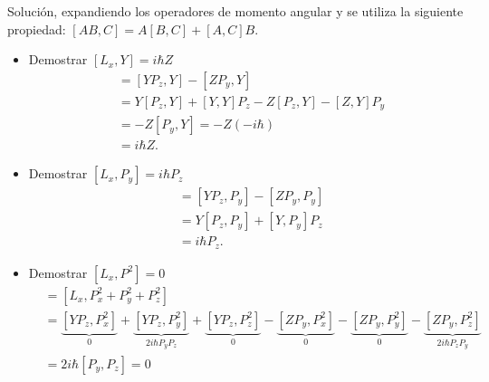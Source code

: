 \begin{ejercicio}
	Solución, expandiendo los operadores de momento angular y se utiliza la siguiente propiedad: $[AB,C] = A[B,C] + [A,C]B$.
	\begin{itemize}
		\item Demostrar $[L_x ,Y] = i\hbar Z$
			\begin{align*}
				&= [YP_z ,Y] - [ZP_y ,Y] \\
				&= Y[P_z ,Y] + [Y,Y]P_z - Z[P_z ,Y] - [Z,Y]P_y \\
				&= -Z[P_y ,Y] = -Z(-i\hbar) \\
				&= i\hbar Z.
			\end{align*}
		\item Demostrar $[L_x ,P_y] = i\hbar P_z$
			\begin{align*}
				&= [YP_z ,P_y] - [ZP_y ,P_y] \\
				&= Y[P_z ,P_y] + [Y,P_y]P_z \\
				&= i\hbar P_z.
			\end{align*}
		\item Demostrar $[L_x ,P^2] = 0$
			\begin{align*}
				&= [L_x ,P_x ^2 + P_y ^2 + P_z ^2] \\
				&= \underbrace{[YP_z,P_x ^2]}_{0} + \underbrace{[YP_z,P_y ^2]}_{2i\hbar P_y P_z} + \underbrace{[YP_z,P_z ^2]}_{0} - \underbrace{[ZP_y,P_x ^2]}_{0} - \underbrace{[ZP_y,P_y ^2]}_{0} - \underbrace{[ZP_y,P_z ^2]}_{2i\hbar P_z P_y} \\
				&= 2i\hbar [P_y,P_z] = 0
			\end{align*}
	\end{itemize}
\end{ejercicio}




